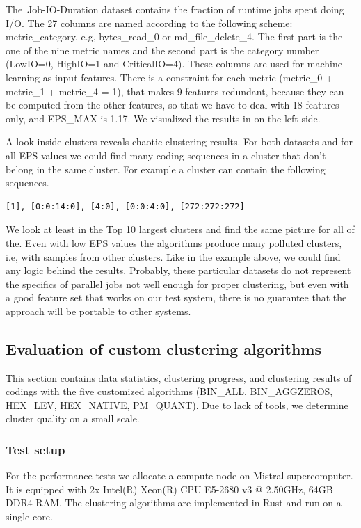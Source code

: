 \documentclass[]{llncs}
\begin{document}
The\ Job-IO-Duration dataset contains the fraction of runtime jobs spent doing I/O.
 The 27 columns are named according to the following scheme: metric\_category, e.g, bytes\_read\_0 or md\_file\_delete\_4.
The first part is the one of the nine metric names and the second part is the category number (LowIO=0, HighIO=1 and CriticalIO=4).
These columns are used for machine learning as input features.
There is a constraint for each metric (metric\_0 + metric\_1 + metric\_4 = 1), that makes 9 features redundant, because they can be computed from the other features, so that we have to deal with 18 features only, and EPS\_MAX is 1.17.
We visualized the results in  on the left side.

A look inside clusters reveals chaotic clustering results.
For both datasets and for all EPS values we could find many coding sequences in a cluster that don’t belong in the same cluster.
For example a cluster can contain the following sequences.

\begin{lstlisting}
[1], [0:0:14:0], [4:0], [0:0:4:0], [272:272:272] 
\end{lstlisting}

We look at least in the Top 10 largest clusters and find the same picture for all of the.
Even with low EPS values the algorithms produce many polluted clusters, i.e, with samples from other clusters.
Like in the example above, we could find any logic behind the results.
Probably, these particular datasets do not represent the specifics of parallel jobs not well enough for proper clustering, but even with a good feature set that works on our test system, there is no guarantee that the approach will be portable to other systems.

\subsection{Evaluation of custom clustering algorithms}
This section contains data statistics, clustering progress, and clustering results of codings with the five customized algorithms (BIN\_ALL, BIN\_AGGZEROS, HEX\_LEV, HEX\_NATIVE, PM\_QUANT).
Due to lack of tools, we determine cluster quality on a small scale.

\subsubsection{Test setup}
For the performance tests we allocate a compute node on Mistral supercomputer.
It is equipped with 2x Intel(R) Xeon(R) CPU E5-2680 v3 @ 2.50GHz, 64GB DDR4 RAM.
The clustering algorithms are implemented in Rust and run on a single core.
\end{document}
